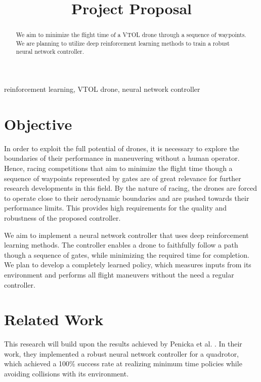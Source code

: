 \documentclass[conference]{IEEEtran}
\begin{document}
\title{Project Proposal}

\author{
\and
{}

}

\maketitle




\begin{abstract}
We aim to minimize the flight time of a VTOL drone through a sequence of waypoints. We are planning to utilize deep reinforcement learning methods to train a robust neural network controller.

\end{abstract}

\begin{IEEEkeywords}
reinforcement learning, VTOL drone, neural network controller
\end{IEEEkeywords}

\section{Objective}
In order to exploit the full potential of drones, it is necessary to explore the boundaries of their performance in maneuvering without a human operator. Hence, racing competitions that aim to minimize the flight time though a sequence of waypoints represented by gates are of great relevance for further research developments in this field. 
By the nature of racing, the drones are forced to operate close to their aerodynamic boundaries and are pushed towards their performance limits. This provides high requirements for the quality and robustness of the proposed controller.

We aim to implement a neural network controller that uses deep reinforcement learning methods.
The controller enables a drone to faithfully follow a path though a sequence of gates, while minimizing the required time for completion. We plan to develop a completely learned policy, which measures inputs from its environment and performs all flight maneuvers without the need a regular controller.

\section{Related Work} %
This research will build upon the results achieved by Penicka et al. \cite{b1}. In their work, they implemented a robust neural network controller for a quadrotor, which achieved a 100\% success rate at realizing minimum time policies while avoiding collisions with its environment. 
\end{document}
